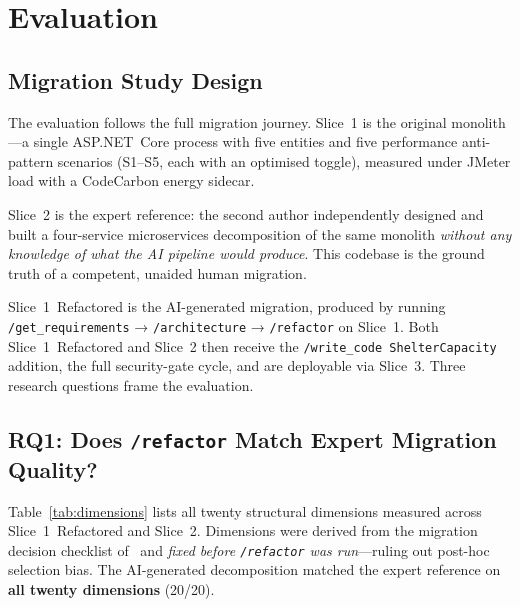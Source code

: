 \documentclass[10pt,journal,compsoc]{IEEEtran}
\begin{document}
\section{Evaluation}
\label{sec:evaluation}

\subsection{Migration Study Design}
The evaluation follows the full migration journey.  Slice~1 is the
original monolith—a single ASP.NET~Core process with five entities
and five performance anti-pattern scenarios (S1–S5, each with an
optimised toggle), measured under JMeter load with a CodeCarbon
energy sidecar.

Slice~2 is the expert reference: the second author independently
designed and built a four-service microservices decomposition of the
same monolith \emph{without any knowledge of what the AI pipeline
would produce}.  This codebase is the ground truth of a competent,
unaided human migration.

Slice~1~Refactored is the AI-generated migration, produced by running
\texttt{/get\_requirements} → \texttt{/architecture} →
\texttt{/refactor} on Slice~1.  Both Slice~1~Refactored and Slice~2
then receive the \texttt{/write\_code~ShelterCapacity} addition, the
full security-gate cycle, and are deployable via Slice~3.
Three research questions frame the evaluation.

\subsection{RQ1: Does \texttt{/refactor} Match Expert Migration Quality?}
Table~\ref{tab:dimensions} lists all twenty structural dimensions
measured across Slice~1~Refactored and Slice~2.  Dimensions were
derived from the migration decision checklist of~\cite{taibi2017processes}
and \emph{fixed before \texttt{/refactor} was run}—ruling out
post-hoc selection bias.  The AI-generated decomposition matched the
expert reference on \textbf{all twenty dimensions} (20/20).
\end{document}
